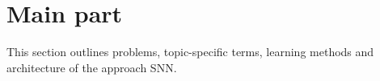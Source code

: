 \section{Main part}
\label{sec:main_part}
This section outlines problems, topic-specific terms, learning methods and architecture of the approach \ac{SNN}.




